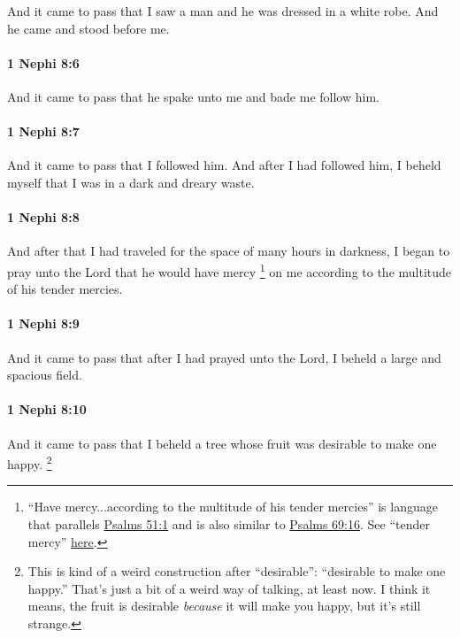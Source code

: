			And it came to pass that I saw a man and he was dressed in a white robe.
			And he came and stood before me.

		\paragraph{1 Nephi 8:6} %
			\label{1NEPHI-8-6}

			And it came to pass that he spake unto me and bade me follow him.

		\paragraph{1 Nephi 8:7} %
			\label{1NEPHI-8-7}

			And it came to pass that I followed him.
			And after I had followed him,
			I beheld myself that I was in a dark and dreary waste.

		\paragraph{1 Nephi 8:8} %
			\label{1NEPHI-8-8}

			And after that I had traveled for the space of many hours in darkness,
			I began to pray unto the Lord that he would have mercy%
				\footnote{%
					``Have mercy...according to the multitude of his tender mercies'' is language that parallels \hyperref[PSALMS-51-1]{Psalms 51:1} and is also similar to \hyperref[PSALMS-69-16]{Psalms 69:16}. See ``tender mercy'' \hyperref[MERCY-PHRASES]{here}.
					}
			on me
			according to the multitude of his tender mercies.

		\paragraph{1 Nephi 8:9} %
			\label{1NEPHI-8-9}

			And it came to pass that after I had prayed unto the Lord,
			I beheld a large and spacious field.

		\paragraph{1 Nephi 8:10} %
			\label{1NEPHI-8-10}

			And it came to pass that I beheld a tree
			whose fruit was desirable to make one happy.%
				\footnote{%
					\label{1NEPHI-8-10-NOTE-to}%
					This is kind of a weird construction after ``desirable'': ``desirable to make one happy.'' That's just a bit of a weird way of talking, at least now. I think it means, the fruit is desirable \textit{because} it will make you happy, but it's still strange.
					}

